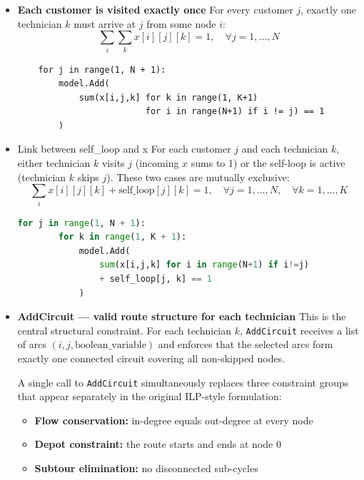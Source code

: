 \documentclass[11pt]{article}
\begin{document}
\begin{itemize}
    \item \textbf{Each customer is visited exactly once}\newline
    For every customer $j$, exactly one technician $k$ must arrive at $j$ from some node $i$:
    $$\sum_{i} \sum_{k} x[i][j][k] = 1, \quad \forall j = 1, \dots, N$$
    
    \begin{lstlisting}
    for j in range(1, N + 1):
        model.Add(
            sum(x[i,j,k] for k in range(1, K+1)
                         for i in range(N+1) if i != j) == 1
        )
    \end{lstlisting}

    \item Link between self\_loop and x\newline
    For each customer $j$ and each technician $k$, either technician $k$ visits $j$ (incoming $x$ sums to 1) or the self-loop is active (technician $k$ skips $j$). These two cases are mutually exclusive:
    $$\sum_{i} x[i][j][k] + \text{self\_loop}[j][k] = 1, \quad \forall j = 1,\dots,N, \quad \forall k = 1,\dots,K$$
    
    \begin{lstlisting}[language=Python]
    for j in range(1, N + 1):
        for k in range(1, K + 1):
            model.Add(
                sum(x[i,j,k] for i in range(N+1) if i!=j) 
                + self_loop[j, k] == 1
            )
    \end{lstlisting}

    \item \textbf{AddCircuit — valid route structure for each technician}\newline
    This is the central structural constraint. For each technician $k$, \texttt{AddCircuit} receives a list of arcs $(i, j, \text{boolean\_variable})$ and enforces that the selected arcs form exactly one connected circuit covering all non-skipped nodes.
    
    A single call to \texttt{AddCircuit} simultaneously replaces three constraint groups that appear separately in the original ILP-style formulation:
    \begin{itemize}
        \item \textbf{Flow conservation:} in-degree equals out-degree at every node
        \item \textbf{Depot constraint:} the route starts and ends at node 0
        \item \textbf{Subtour elimination:} no disconnected sub-cycles
    \end{itemize}
    

\end{itemize}
\end{document}
